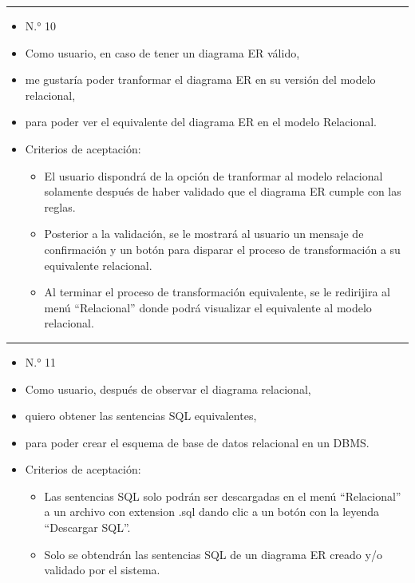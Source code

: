 \noindent\rule{\textwidth}{1pt}
\begin{itemize}
	\item N.° 10
	\item Como usuario, en caso de tener un diagrama ER válido,
	\item me gustaría poder tranformar el diagrama ER en su versión del modelo relacional,
	\item para poder ver el equivalente del diagrama ER en el modelo Relacional.
	\item Criterios de aceptación:
	\begin{itemize}
		\item El usuario dispondrá de la opción de tranformar al modelo relacional solamente después de haber validado que el diagrama ER cumple con las reglas.
		\item Posterior a la validación, se le mostrará al usuario un mensaje de confirmación y un botón para disparar el proceso de transformación a su equivalente relacional.
		\item Al terminar el proceso de transformación equivalente, se le redirijira al menú ``Relacional'' donde podrá visualizar el equivalente al modelo relacional.
	\end{itemize}
\end{itemize}
\noindent\rule{\textwidth}{1pt}
\begin{itemize}
	\item N.° 11
	\item Como usuario, después de observar el diagrama relacional,
	\item quiero obtener las sentencias SQL equivalentes,
	\item para poder crear el esquema de base de datos relacional en un DBMS.
	\item Criterios de aceptación:
	\begin{itemize}
		\item Las sentencias SQL solo podrán ser descargadas en el menú ``Relacional'' a un archivo con extension .sql dando clic a un botón con la leyenda ``Descargar SQL''.
		\item Solo se obtendrán las sentencias SQL de un diagrama ER creado y/o validado por el sistema.
	\end{itemize}
\end{itemize}
